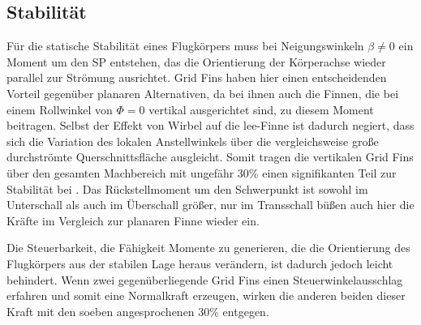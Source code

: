 \subsection{Stabilität}
Für die statische Stabilität eines Flugkörpers muss bei Neigungswinkeln $\beta \neq 0$ ein Moment um den \gls{SP} entstehen, das die Orientierung der Körperachse wieder parallel zur Strömung ausrichtet. Grid Fins haben hier einen entscheidenden Vorteil gegenüber planaren Alternativen, da bei ihnen auch die Finnen, die bei einem Rollwinkel von $\Phi = 0$ vertikal ausgerichtet sind, zu diesem Moment beitragen. Selbst der Effekt von Wirbel auf die lee-Finne ist dadurch negiert, dass sich die Variation des lokalen Anstellwinkels über die vergleichsweise große durchströmte Querschnittsfläche ausgleicht. Somit tragen die vertikalen Grid Fins über den gesamten Machbereich mit ungefähr 30\% einen signifikanten Teil zur Stabilität bei \cite{vergleichPlanarNATO}. Das Rückstellmoment um den Schwerpunkt ist sowohl im Unterschall als auch im Überschall größer, nur im Transschall büßen auch hier die Kräfte im Vergleich zur planaren Finne wieder ein.

Die Steuerbarkeit, die Fähigkeit Momente zu generieren, die die Orientierung des Flugkörpers aus der stabilen Lage heraus verändern, ist dadurch jedoch leicht behindert. Wenn zwei gegenüberliegende Grid Fins einen Steuerwinkelausschlag erfahren und somit eine Normalkraft erzeugen, wirken die anderen beiden dieser Kraft mit den soeben angesprochenen 30\% entgegen.
